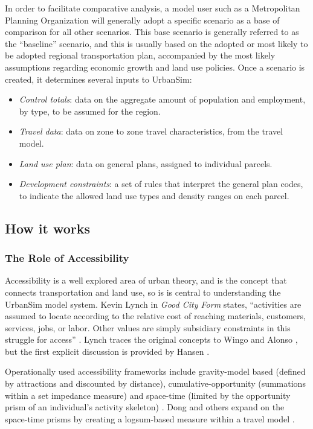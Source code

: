 In order to facilitate comparative analysis, a model user such as a Metropolitan Planning Organization will generally adopt a specific scenario as a base of comparison for all other scenarios. This base scenario is generally referred to as the \enquote{baseline} scenario, and this is usually based on the adopted or most likely to be adopted regional transportation plan, accompanied by the most likely assumptions regarding economic growth and land use policies. Once a scenario is created, it determines several inputs to UrbanSim:

\begin{itemize}
    \item \textit{Control totals}: data on the aggregate amount of population and employment, by type, to be assumed for the region.
    \item \textit{Travel data}: data on zone to zone travel characteristics, from the travel model.
    \item \textit{Land use plan}: data on general plans, assigned to individual parcels.
    \item \textit{Development constraints}: a set of rules that interpret the general plan codes, to indicate the allowed land use types and density ranges on each parcel.
\end{itemize}

\subsection{How it works}

\subsubsection{The Role of Accessibility}

Accessibility is a well explored area of urban theory, and is the concept that connects transportation and land use, so is is central to understanding the UrbanSim model system.  Kevin Lynch in \textit{Good City Form} states, \enquote{activities are assumed to locate according to the relative cost of reaching materials, customers, services, jobs, or labor.  Other values are simply subsidiary constraints in this struggle for access} \citep{lynch_good_1984}.  Lynch traces the original concepts to Wingo and Alonso \citep{wingo_transportation_1961,alonso_location_1964}, but the first explicit discussion is provided by Hansen \citep{hansen_how_1959}.

Operationally used accessibility frameworks include gravity-model based (defined by attractions and discounted by distance), cumulative-opportunity (summations within a set impedance measure) and space-time (limited by the opportunity prism of an individual's activity skeleton) \citep{kwan_space-time_1998,miller_measuring_1999}.  Dong and others expand on the space-time prisms by creating a logsum-based measure within a travel model \citep{dong_moving_2006}.  

